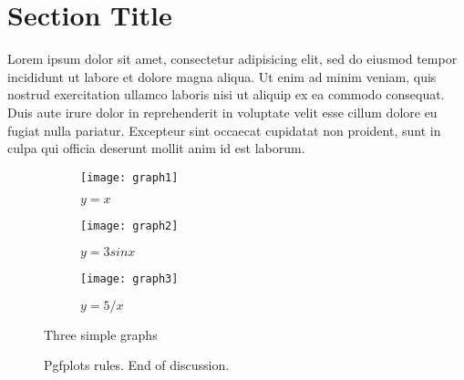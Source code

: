 
    \section{Section Title}
        Lorem ipsum dolor sit amet, consectetur adipisicing elit, sed do eiusmod tempor incididunt ut labore et dolore magna aliqua. Ut enim ad minim veniam, quis nostrud exercitation ullamco laboris nisi ut aliquip ex ea commodo consequat. Duis aute irure dolor in reprehenderit in voluptate velit esse cillum dolore eu fugiat nulla pariatur. Excepteur sint occaecat cupidatat non proident, sunt in culpa qui officia deserunt mollit anim id est laborum.

        \begin{figure}
            \centering
            \begin{subfigure}[b]{0.3\textwidth}
                \centering
                \texttt{[image: graph1]}
                \caption{$y=x$}
                \label{fig:y equals x}
            \end{subfigure}
            \hfill
            \begin{subfigure}[b]{0.3\textwidth}
                \centering
                \texttt{[image: graph2]}
                \caption{$y=3sinx$}
                \label{fig:three sin x}
            \end{subfigure}
            \hfill
            \begin{subfigure}[b]{0.3\textwidth}
                \centering
                \texttt{[image: graph3]}
                \caption{$y=5/x$}
                \label{fig:five over x}
            \end{subfigure}
            \caption{Three simple graphs}
            \label{fig:three graphs}
        \end{figure}


        \begin{figure}[ht!]
            \centering
            \caption{Pgfplots rules. End of discussion.}
            \label{fig:pgfplotsExample}
        \end{figure}

